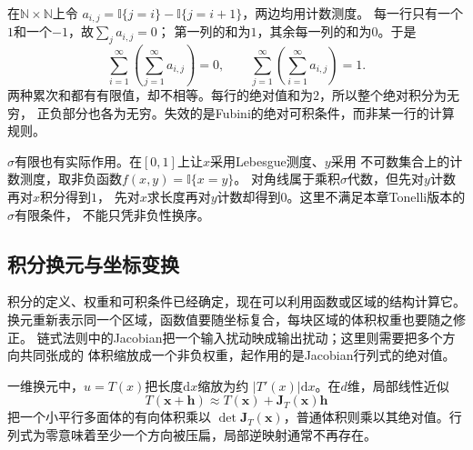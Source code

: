 \begin{example}[行列各自可加仍不足以换序]
\label{ex:analysis-iterated-sum-failure}
在$\mathbb N\times\mathbb N$上令
$a_{i,j}=\mathbb I\{j=i\}-\mathbb I\{j=i+1\}$，两边均用计数测度。
每一行只有一个$1$和一个$-1$，故$\sum_j a_{i,j}=0$；
第一列的和为$1$，其余每一列的和为$0$。于是
\[
 \sum_{i=1}^{\infty}\left(\sum_{j=1}^{\infty}a_{i,j}\right)=0,
 \qquad
 \sum_{j=1}^{\infty}\left(\sum_{i=1}^{\infty}a_{i,j}\right)=1.
\]
两种累次和都有有限值，却不相等。每行的绝对值和为$2$，所以整个绝对积分为无穷，
正负部分也各为无穷。失效的是Fubini的绝对可积条件，而非某一行的计算规则。
\end{example}

$\sigma$有限也有实际作用。在$[0,1]$上让$x$采用Lebesgue测度、$y$采用
不可数集合上的计数测度，取非负函数$f(x,y)=\mathbb I\{x=y\}$。
对角线属于乘积$\sigma$代数，但先对$y$计数再对$x$积分得到$1$，
先对$x$求长度再对$y$计数却得到$0$。这里不满足本章Tonelli版本的$\sigma$有限条件，
不能只凭非负性换序。

\subsection{积分换元与坐标变换}
\label{sec:analysis-coordinate-change-integral-applications}
积分的定义、权重和可积条件已经确定，现在可以利用函数或区域的结构计算它。
换元重新表示同一个区域，函数值要随坐标复合，每块区域的体积权重也要随之修正。
链式法则中的Jacobian把一个输入扰动映成输出扰动；这里则需要把多个方向共同张成的
体积缩放成一个非负权重，起作用的是Jacobian行列式的绝对值。

一维换元中，$u=T(x)$把长度$\mathrm{d}x$缩放为约 $|T'(x)|\mathrm{d}x$。在$d$维，局部线性近似
\[   T(\bm{x}+\bm{h})   \approx   T(\bm{x})+\bm{J}_T(\bm{x})\bm{h} \]
把一个小平行多面体的有向体积乘以 $\det\bm{J}_T(\bm{x})$，普通体积则乘以其绝对值。行列式为零意味着至少一个方向被压扁，局部逆映射通常不再存在。

